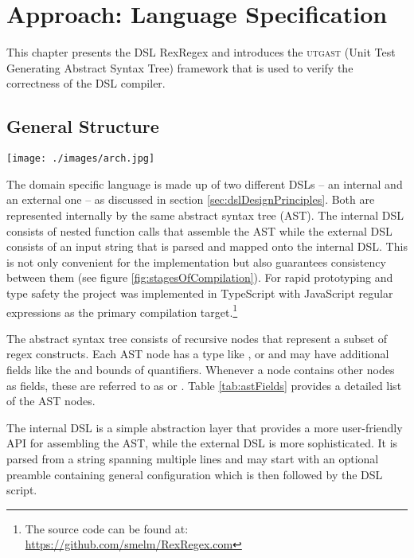 \chapter{Approach: Language Specification}

This chapter presents the DSL RexRegex and introduces the \textsc{utgast} (Unit Test Generating Abstract Syntax Tree) framework that is used to verify the correctness of the DSL compiler.

\section{General Structure}

\begin{boxFigure}[title={Stages of Compilation},label=fig:stagesOfCompilation]
\texttt{[image: ./images/arch.jpg]}
\end{boxFigure}

The domain specific language is made up of two different DSLs -- an internal and an external one -- as discussed in section \ref{sec:dslDesignPrinciples}. Both are represented internally by the same abstract syntax tree (AST). The internal DSL consists of nested function calls that assemble the AST while the external DSL consists of an input string that is parsed and mapped onto the internal DSL. This is not only convenient for the implementation but also guarantees consistency between them (see figure \ref{fig:stagesOfCompilation}). For rapid prototyping and type safety the project was implemented in TypeScript with JavaScript regular expressions as the primary compilation target.\footnote{The source code can be found at: \url{https://github.com/smelm/RexRegex.com}} 

The abstract syntax tree consists of recursive nodes that represent a subset of regex constructs. Each AST node has a type like ,  or  and may have additional fields like the  and  bounds of quantifiers. Whenever a node contains other nodes as fields, these are referred to as  or . Table \ref{tab:astFields} provides a detailed list of the AST nodes.

The internal DSL is a simple abstraction layer that provides a more user-friendly API for assembling the AST, while the external DSL is more sophisticated. It is parsed from a string spanning multiple lines and may start with an optional preamble containing general configuration which is then followed by the DSL script.

